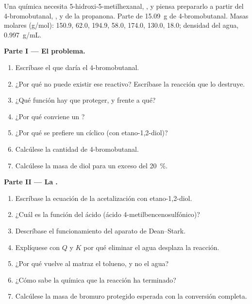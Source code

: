 \begin{problem}
\label{pb:b1:acetals-protection:1}
Una química necesita 5-hidroxi-5-metilhexanal,
, y piensa prepararlo a partir del
4-bromobutanal, , y de la propanona. Parte de
\qty{15.09}{g} de 4-bromobutanal. Masas molares
(\unit{g/mol}):  150.9,  62.0,  194.9,
 58.0,  174.0,  130.0,  18.0;
densidad del agua, \qty{0.997}{g/mL}.

\medskip
\noindent\textbf{Parte I --- El problema.}
\begin{enumerate}
  \item Escríbase el  que daría el 4-bromobutanal.
  \item ¿Por qué no puede existir ese reactivo? Escríbase la reacción que
        lo destruye.
  \item ¿Qué función hay que proteger, y frente a qué?
  \item ¿Por qué conviene un ?
  \item ¿Por qué se prefiere un  cíclico (con etano-1,2-diol)?
  \item Calcúlese la cantidad de 4-bromobutanal.
  \item Calcúlese la masa de diol para un exceso del \qty{20}{\percent}.
\end{enumerate}

\medskip
\noindent\textbf{Parte II --- La .}
\begin{enumerate}[resume]
  \item Escríbase la ecuación de la acetalización con etano-1,2-diol.
  \item ¿Cuál es la función del  ácido (ácido
        4-metilbencenosulfónico)?
  \item Descríbase el funcionamiento del aparato de Dean--Stark.
  \item Explíquese con $Q$ y $K$ por qué eliminar el agua desplaza la
        reacción.
  \item ¿Por qué vuelve al matraz el tolueno, y no el agua?
  \item ¿Cómo sabe la química que la reacción ha terminado?
  \item Calcúlese la masa de bromuro protegido esperada con la conversión
        completa.
\end{enumerate}


\end{problem}
